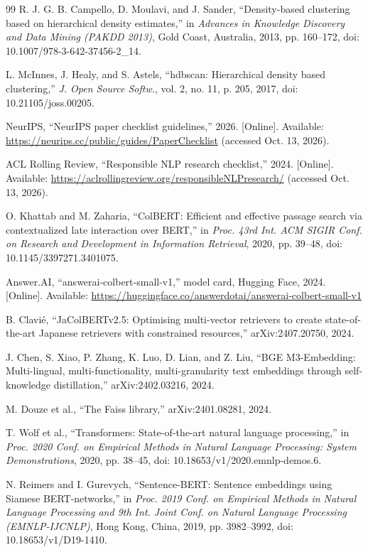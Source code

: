 \documentclass[11pt,a4paper]{article}
\begin{document}
\begin{thebibliography}{99}
 R. J. G. B. Campello, D. Moulavi, and J. Sander, ``Density-based clustering based on hierarchical density estimates,'' in \emph{Advances in Knowledge Discovery and Data Mining (PAKDD 2013)}, Gold Coast, Australia, 2013, pp. 160–172, doi: 10.1007/978-3-642-37456-2\_14.

 L. McInnes, J. Healy, and S. Astels, ``hdbscan: Hierarchical density based clustering,'' \emph{J. Open Source Softw.}, vol. 2, no. 11, p. 205, 2017, doi: 10.21105/joss.00205.

 NeurIPS, ``NeurIPS paper checklist guidelines,'' 2026. [Online]. Available: \url{https://neurips.cc/public/guides/PaperChecklist} (accessed Oct. 13, 2026).

 ACL Rolling Review, ``Responsible NLP research checklist,'' 2024. [Online]. Available: \url{https://aclrollingreview.org/responsibleNLPresearch/} (accessed Oct. 13, 2026).

 O. Khattab and M. Zaharia, ``ColBERT: Efficient and effective passage search via contextualized late interaction over BERT,'' in \emph{Proc. 43rd Int. ACM SIGIR Conf. on Research and Development in Information Retrieval}, 2020, pp. 39–48, doi: 10.1145/3397271.3401075.

 Answer.AI, ``answerai-colbert-small-v1,'' model card, Hugging Face, 2024. [Online]. Available: \url{https://huggingface.co/answerdotai/answerai-colbert-small-v1}

 B. Clavié, ``JaColBERTv2.5: Optimising multi-vector retrievers to create state-of-the-art Japanese retrievers with constrained resources,'' arXiv:2407.20750, 2024.

 J. Chen, S. Xiao, P. Zhang, K. Luo, D. Lian, and Z. Liu, ``BGE M3-Embedding: Multi-lingual, multi-functionality, multi-granularity text embeddings through self-knowledge distillation,'' arXiv:2402.03216, 2024.

 M. Douze et al., ``The Faiss library,'' arXiv:2401.08281, 2024.

 T. Wolf et al., ``Transformers: State-of-the-art natural language processing,'' in \emph{Proc. 2020 Conf. on Empirical Methods in Natural Language Processing: System Demonstrations}, 2020, pp. 38–45, doi: 10.18653/v1/2020.emnlp-demos.6.

 N. Reimers and I. Gurevych, ``Sentence-BERT: Sentence embeddings using Siamese BERT-networks,'' in \emph{Proc. 2019 Conf. on Empirical Methods in Natural Language Processing and 9th Int. Joint Conf. on Natural Language Processing (EMNLP-IJCNLP)}, Hong Kong, China, 2019, pp. 3982–3992, doi: 10.18653/v1/D19-1410.


\end{thebibliography}
\end{document}
